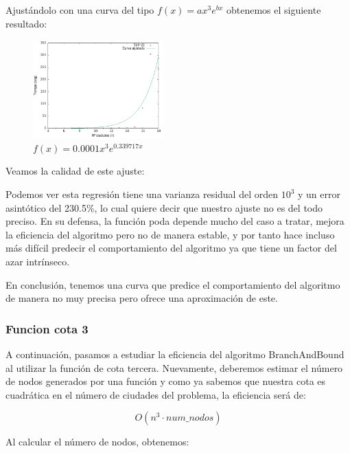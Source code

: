 \documentclass{article}
\begin{document}
Ajustándolo con una curva del tipo $f(x)=a x^3 e^{b x}$ obtenemos el siguiente resultado: 
\begin{figure}[H]
    \centering
    \includegraphics[width=0.45\textwidth]{Sucio_Olga/BB_ajuste2/CurvaAjustadaExponencial.png}
    \caption*{$f(x)=0.0001 x^3 e^{0.339717x}$}
\end{figure}

Veamos la calidad de este ajuste: 


Podemos ver esta regresión tiene una varianza residual del orden $10^3$ y un error asintótico del 230.5\%, lo cual quiere decir que nuestro ajuste no es del todo preciso. En su defensa, la función poda depende mucho del caso a tratar, mejora la eficiencia del algoritmo pero no de manera estable, y por tanto hace incluso más difícil predecir el comportamiento del algoritmo ya que tiene un factor del azar intrínseco.

En conclusión, tenemos una curva que predice el comportamiento  del algoritmo de manera no muy precisa pero ofrece una aproximación de este.
\subsubsection{Funcion cota 3}

A continuación, pasamos a estudiar la eficiencia del algoritmo BranchAndBound al utilizar la función de cota tercera. Nuevamente, deberemos estimar el número de nodos generados por una función y como ya sabemos que nuestra cota es cuadrática en el número de ciudades del problema, la eficiencia será de:

\[
    O(n^3 \cdot num\_nodos)
\]

Al calcular el número de nodos, obtenemos:
\end{document}
